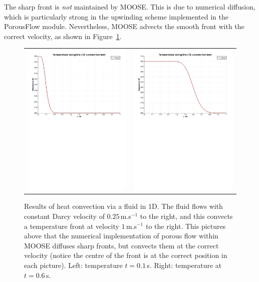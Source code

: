 \documentclass[]{scrreprt}
\begin{document}
The sharp front is {\em not} maintained by
MOOSE.  This is due to numerical diffusion, which is particularly
strong in the upwinding scheme implemented in the PorousFlow module.
Nevertheless, MOOSE advects the smooth front with the correct
velocity, as shown in Figure~\ref{convect_1d.fig}.

\begin{figure}[htb]
\begin{center}
\begin{tabular}{cc}
\includegraphics[width=7cm]{convect_1d_0_1.pdf}  &
\includegraphics[width=7cm]{convect_1d_0_6.pdf}
\end{tabular}
\caption{Results of heat convection via a fluid in 1D.  The fluid
  flows with constant Darcy velocity of $0.25$\,m.s$^{-1}$ to the
  right, and this convects a temperature front at velocity
  $1$\,m.s$^{-1}$ to the right.  This pictures above
  that the numerical implementation of porous flow within
  MOOSE diffuses sharp fronts, but convects them at the correct
  velocity (notice the centre of
  the front is at the correct position in each picture).  Left: temperature
  $t=0.1$\,s.  Right: temperature
  at $t=0.6$\,s.}
\label{convect_1d.fig}
\end{center}
\end{figure}
\end{document}

